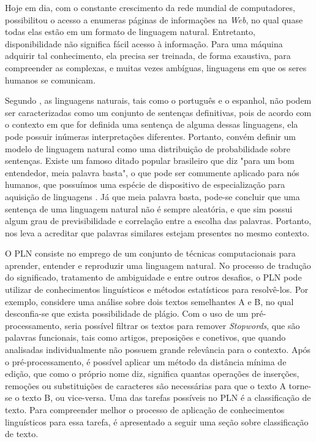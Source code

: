 Hoje em dia, com o constante crescimento da rede mundial de computadores, possibilitou o acesso a enumeras páginas de informações na \textit{Web}, no qual quase todas elas estão em um formato de linguagem natural. Entretanto, disponibilidade não significa fácil acesso à informação. Para uma máquina adquirir tal conhecimento, ela precisa ser treinada, de forma exaustiva, para compreender as complexas, e muitas vezes ambíguas, linguagens em que os seres humanos se comunicam.

Segundo \cite{russell1994inteligencia}, as linguagens naturais, tais como o português e o espanhol, não podem ser caracterizadas como um conjunto de sentenças definitivas, pois de acordo com o contexto em que for definida uma sentença de alguma dessas linguagens, ela pode possuir inúmeras interpretações diferentes. Portanto, convém definir um modelo de linguagem natural como uma distribuição de probabilidade sobre sentenças. Existe um famoso ditado popular brasileiro que diz "para um bom entendedor, meia palavra basta", o que pode ser comumente aplicado para nós humanos, que possuímos uma espécie de dispositivo de especialização para aquisição de linguagens \citep{chomsky2014aspects}. Já que meia palavra basta, pode-se concluir que uma sentença de uma linguagem natural não é sempre aleatória, e que sim possui algum grau de previsibilidade e correlação entre a escolha das palavras. Portanto, nos leva a acreditar que palavras similares estejam presentes no mesmo contexto.

O PLN consiste no emprego de um conjunto de técnicas computacionais para aprender, entender e reproduzir uma linguagem natural. No processo de tradução do significado, tratamento de ambiguidade e entre outros desafios, o PLN pode utilizar de conhecimentos linguísticos e métodos estatísticos para resolvê-los. Por exemplo, considere uma análise sobre dois textos semelhantes A e B, no qual desconfia-se que exista possibilidade de plágio. Com o uso de um pré-processamento, seria possível filtrar os textos para remover \textit{Stopwords}, que são palavras funcionais, tais como artigos, preposições e conetivos, que quando analisadas individualmente não possuem grande relevância para o contexto. Após o pré-processamento, é possível aplicar um método da distância mínima de edição, que como o próprio nome diz, significa quantas operações de inserções, remoções ou substituições de caracteres são necessárias para que o texto A torne-se o texto B, ou vice-versa. Uma das tarefas possíveis no PLN é a classificação de texto. Para compreender melhor o processo de aplicação de conhecimentos linguísticos para essa tarefa, é apresentado a seguir uma seção sobre classificação de
texto.

